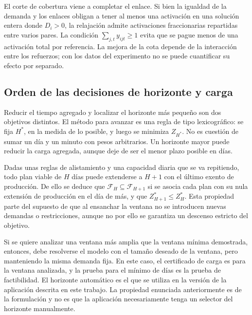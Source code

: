 El corte de cobertura viene a completar el enlace. Si bien la igualdad de la demanda y los enlaces obligan a tener al menos una activación en una solución entera donde $D_i>0$, la relajación admite activaciones fraccionarias repartidas entre varios pares. La condición $\sum_{j,t}y_{ijt}\geq1$ evita que se pague menos de una activación total por referencia. La mejora de la cota depende de la interacción entre los refuerzos; con los datos del experimento no se puede cuantificar su efecto por separado.

\subsection{Orden de las decisiones de horizonte y carga}
Reducir el tiempo agregado y localizar el horizonte más pequeño son dos objetivos distintos. El método para avanzar es una regla de tipo lexicográfico: se fija $H^*$, en la medida de lo posible, y luego se minimiza $Z_{H^*}$. No es cuestión de sumar un día y un minuto con pesos arbitrarios. Un horizonte mayor puede reducir la carga agregada, aunque deje de ser el menor plazo posible en días.

Dadas unas reglas de alistamiento y una capacidad diaria que se va repitiendo, todo plan viable de $H$ días puede extenderse a $H+1$ con el último exento de producción. De ello se deduce que $\mathcal F_H\subseteq\mathcal F_{H+1}$ si se asocia cada plan con su nula extensión de producción en el día de más, y que $Z_{H+1}^*\leq Z_H^*$. Esta propiedad parte del supuesto de que al ensanchar la ventana no se introducen nuevas demandas o restricciones, aunque no por ello se garantiza un descenso estricto del objetivo.

Si se quiere analizar una ventana más amplia que la ventana mínima demostrada, entonces, debe resolverse el modelo con el tamaño deseado de la ventana, pero manteniendo la misma demanda fija. En este caso, el certificado de carga es para la ventana analizada, y la prueba para el mínimo de días es la prueba de factibilidad. El horizonte automático es el que se utiliza en la versión de la aplicación descrita en este trabajo. La propiedad enunciada anteriormente es de la formulación y no es que la aplicación necesariamente tenga un selector del horizonte manualmente.
